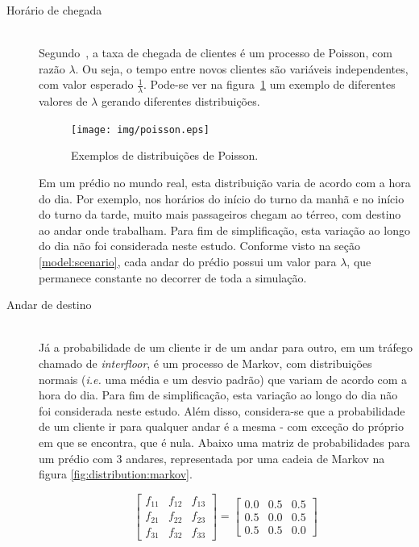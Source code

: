 \begin{description}

\item[Horário de chegada] \hfill \\
Segundo~\cite{Ross:2006:IPM:1197141}, a taxa de chegada de clientes é um
processo de Poisson, com razão $\lambda$. Ou seja, o tempo entre novos clientes
são variáveis independentes, com valor esperado $\frac{1}{\lambda}$. Pode-se ver
na figura~\ref{fig:distribution:poisson} um exemplo de diferentes valores de
$\lambda$ gerando diferentes distribuições.

\begin{figure}[htb!]
  \centering
  \texttt{[image: img/poisson.eps]}
  \caption{Exemplos de distribuições de Poisson.}
\label{fig:distribution:poisson}
\end{figure}

Em um prédio no mundo real, esta distribuição varia de acordo com a hora do dia.
Por exemplo, nos horários do início do turno da manhã e no início do turno da
tarde, muito mais passageiros chegam ao térreo, com destino ao andar onde
trabalham. Para fim de simplificação, esta variação ao longo do dia não foi
considerada neste estudo. Conforme visto na seção \ref{model:scenario}, cada
andar do prédio possui um valor para $\lambda$, que permanece constante no
decorrer de toda a simulação.

\item[Andar de destino] \hfill \\
Já a probabilidade de um cliente ir de um andar para outro, em um tráfego
chamado de \textit{interfloor}, é um processo de Markov, com distribuições
normais (\textit{i.e.} uma média e um desvio padrão) que variam de acordo com a
hora do dia. Para fim de simplificação, esta variação ao longo do dia não foi
considerada neste estudo. Além disso, considera-se que a probabilidade de um
cliente ir para qualquer andar é a mesma - com exceção do próprio em que se
encontra, que é nula. Abaixo uma matriz de probabilidades para um prédio com 3
andares, representada por uma cadeia de Markov na figura
\ref{fig:distribution:markov}.

\[
  \begin{bmatrix}
    f_{11} & f_{12} & f_{13}  \\
    f_{21} & f_{22} & f_{23}  \\
    f_{31} & f_{32} & f_{33}
  \end{bmatrix} = \begin{bmatrix}
    0.0 & 0.5 & 0.5  \\
    0.5 & 0.0 & 0.5  \\
    0.5 & 0.5 & 0.0
  \end{bmatrix}
\]


\end{description}

